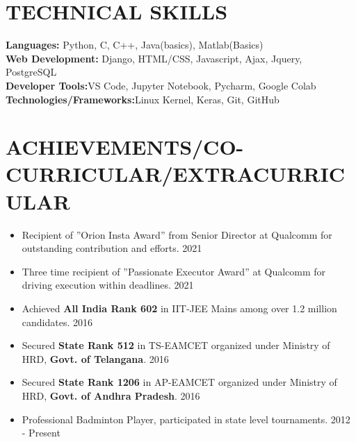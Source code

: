 \documentclass[letterpaper,11pt]{article}
\newcommand{\resumeItem}[1]{
  \item\small{
    {#1 \vspace{-2pt}}
  }
}
\newcommand{\resumeItemListStart}{\begin{itemize}}
\newcommand{\resumeItemListEnd}{\end{itemize}\vspace{-5pt}}
\begin{document}
\section{TECHNICAL SKILLS}
 \begin{itemize}[leftmargin=0.15in, label={\roman*}]
    \small{\item{
             \textbf{Languages:}{\hspace{3cm} Python, C, C++, Java(basics), Matlab(Basics)} 
             \\ \vspace{+1.5pt}
             {\textbf{Web Development:}}{ \hspace{1.570cm}Django, HTML/CSS, Javascript, 															Ajax, Jquery, PostgreSQL}
             \\ \vspace{+1.5pt}
             \textbf{Developer Tools:}{\hspace{2.090cm}VS Code, Jupyter Notebook, Pycharm, 													Google Colab } 
             \\ \vspace{+1.5pt}
             \textbf{Technologies/Frameworks:}{\hspace{0.470cm}Linux Kernel, Keras, Git, 																			GitHub} 		
             \\
    }}
 \end{itemize}


\section{ACHIEVEMENTS/CO-CURRICULAR/EXTRACURRICULAR}
\resumeItemListStart      
        	\resumeItem{Recipient of ”Orion Insta Award” from Senior Director at                                                 Qualcomm for outstanding contribution and efforts. 2021}
            \resumeItem{Three time recipient of ”Passionate Executor Award” at 													Qualcomm for driving execution within deadlines. 2021}
            \resumeItem{Achieved \textbf{All India Rank 602} in IIT-JEE  Mains among                                          over 1.2 million candidates. 2016}
            \resumeItem{Secured \textbf{State Rank 512} in TS-EAMCET organized under 											Ministry of HRD, \textbf{Govt. of Telangana}. 2016}
            \resumeItem{Secured \textbf{State Rank 1206} in AP-EAMCET organized under 										Ministry of HRD,\textbf{ Govt. of Andhra Pradesh}. 2016}
            \resumeItem{Professional Badminton Player, participated in state level 												tournaments. 2012 - Present}
  \resumeItemListEnd
  
\end{document}
